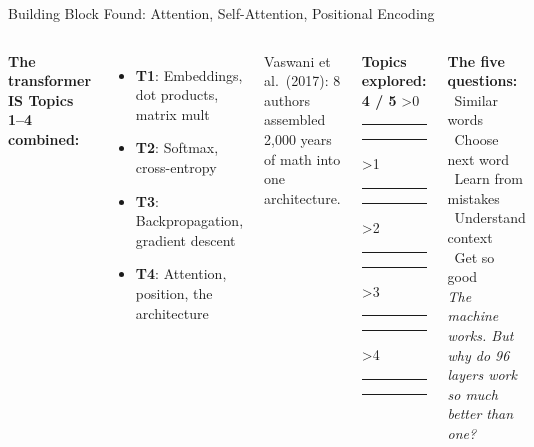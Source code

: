 \documentclass[aspectratio=169,12pt]{beamer}
\newcommand{\progressbar}[1]{%
  \begin{center}\small\textbf{Topics explored: #1 / 5}\hspace{6pt}%
  \ifnum#1>0\textcolor{linalgTeal}{\rule{10pt}{10pt}}\else\textcolor{gray!30}{\rule{10pt}{10pt}}\fi\hspace{2pt}%
  \ifnum#1>1\textcolor{probBlue}{\rule{10pt}{10pt}}\else\textcolor{gray!30}{\rule{10pt}{10pt}}\fi\hspace{2pt}%
  \ifnum#1>2\textcolor{calculusRed}{\rule{10pt}{10pt}}\else\textcolor{gray!30}{\rule{10pt}{10pt}}\fi\hspace{2pt}%
  \ifnum#1>3\textcolor{seqIndigo}{\rule{10pt}{10pt}}\else\textcolor{gray!30}{\rule{10pt}{10pt}}\fi\hspace{2pt}%
  \ifnum#1>4\textcolor{neuronPink}{\rule{10pt}{10pt}}\else\textcolor{gray!30}{\rule{10pt}{10pt}}\fi%
  \end{center}%
}
\begin{document}
\begin{frame}{Building Block Found: Attention, Self-Attention, Positional Encoding}

\begin{columns}[T]
\textbf{The transformer IS Topics 1--4 combined:}

\vspace{0.3em}
\begin{itemize}\small
  \item \textcolor{linalgTeal}{\textbf{T1}}: Embeddings, dot products, matrix mult
  \item \textcolor{probBlue}{\textbf{T2}}: Softmax, cross-entropy
  \item \textcolor{calculusRed}{\textbf{T3}}: Backpropagation, gradient descent
  \item \textcolor{seqIndigo}{\textbf{T4}}: Attention, position, the architecture
\end{itemize}

\vspace{0.3em}
{\small Vaswani et al.\ (2017): 8 authors assembled 2,000 years of math into one architecture.}

\progressbar{4}

\vspace{0.3em}
{\small\textbf{The five questions:}}\\[3pt]
\textcolor{linalgTeal}{\faCheckSquare}~Similar words\\
\textcolor{probBlue}{\faCheckSquare}~Choose next word\\
\textcolor{calculusRed}{\faCheckSquare}~Learn from mistakes\\
\textcolor{seqIndigo}{\faCheckSquare}~Understand context\\
\textcolor{gray!50}{\faSquare}~Get so good\\[6pt]
{\small\textit{The machine works. But why do 96 layers work so much better than one?}}
\end{columns}

\end{frame}
\end{document}
